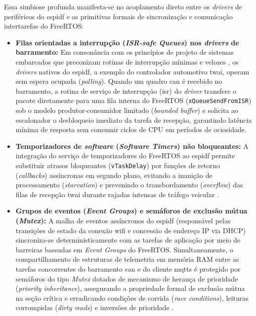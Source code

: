 \documentclass[
	12pt,				%
	openright,			%
	twoside,			%
	a4paper,			%
	english,			%
	brazil				%
	]{abntex2}
\newcounter{quadro}
\begin{document}
Essa simbiose profunda manifesta-se no acoplamento direto entre os \textit{drivers} de
periféricos do \acrshort{espidf} e as primitivas formais de sincronização e comunicação
intertarefas do FreeRTOS:
\begin{itemize}
    \item \textbf{Filas orientadas a interrupção (\textit{ISR-safe Queues}) nos
        \textit{drivers} de barramento:} Em consonância com os princípios de projeto de
        sistemas embarcados que preconizam rotinas de interrupção mínimas e velozes
        \cite{ganssle2008}, os \textit{drivers} nativos do \acrshort{espidf}, a exemplo
        do controlador automotivo \acrshort{twai}, operam sem espera ocupada
        (\textit{polling}). Quando um quadro \acrshort{can} é recebido no barramento, a
        rotina de serviço de interrupção (\acrshort{isr}) do \textit{driver} transfere o
        pacote diretamente para uma fila interna do FreeRTOS
        (\texttt{xQueueSendFromISR}) sob o modelo produtor-consumidor limitado
        (\textit{bounded buffer}) \cite{benari2006} e solicita ao escalonador o
        desbloqueio imediato da tarefa de recepção, garantindo latência mínima de
        resposta sem consumir ciclos de CPU em períodos de ociosidade.
    \item \textbf{Temporizadores de \textit{software} (\textit{Software Timers}) não
        bloqueantes:} A integração do serviço de temporizadores do FreeRTOS ao
        \acrshort{espidf} permite substituir atrasos bloqueantes (\texttt{vTaskDelay})
        por funções de retorno (\textit{callbacks}) assíncronas em segundo plano,
        evitando a inanição de processamento (\textit{starvation}) e prevenindo o
        transbordamento (\textit{overflow}) das filas de recepção \acrshort{twai}
        durante rajadas intensas de tráfego veicular \cite{ganssle2008,espressif2026}.
    \item \textbf{Grupos de eventos (\textit{Event Groups}) e semáforos de exclusão
        mútua (\textit{Mutex}):} A malha de eventos assíncronos do \acrshort{espidf}
        (responsável pelas transições de estado da conexão \acrshort{wifi} e concessão
        de endereço IP via DHCP) sincroniza-se deterministicamente com as tarefas de
        aplicação por meio de barreiras baseadas em \textit{Event Groups} do FreeRTOS.
        Simultaneamente, o compartilhamento de estruturas de telemetria em memória RAM
        entre as tarefas concorrentes do barramento \acrshort{can} e do cliente
        \acrshort{mqtts} é protegido por semáforos do tipo \textit{Mutex} dotados de
        mecanismo de herança de prioridade (\textit{priority inheritance}), assegurando
        a propriedade formal de exclusão mútua na seção crítica e erradicando condições
        de corrida (\textit{race conditions}), leituras corrompidas (\textit{dirty
        reads}) e inversões de prioridade \cite{benari2006,espressif2026}.
\end{itemize}
\end{document}
